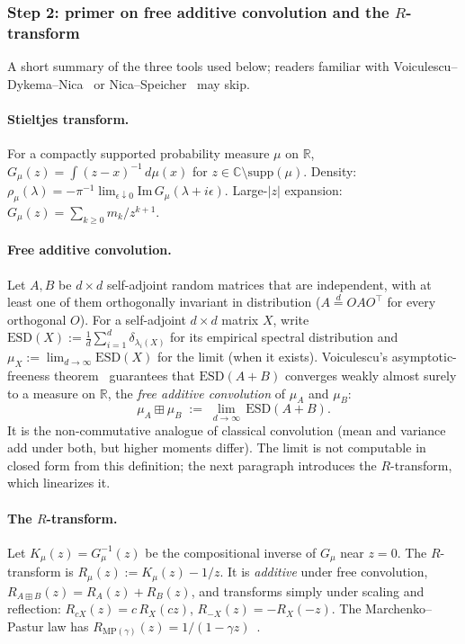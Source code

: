 \documentclass{article}
\newcommand{\R}{\mathbb{R}}
\begin{document}
\subsubsection{Step 2: primer on free additive convolution and the
$R$-transform}
\label{app:fp-primer}

A short summary of the three tools used below; readers familiar with
Voiculescu--Dykema--Nica~\cite{voiculescu1992} or
Nica--Speicher~\cite{nica2006} may skip.

\paragraph{Stieltjes transform.}
For a compactly supported probability measure $\mu$ on $\R$,
$G_\mu(z) = \int (z-x)^{-1}\,d\mu(x)$ for $z \in \mathbb{C}\setminus\mathrm{supp}(\mu)$.
Density: $\rho_\mu(\lambda) = -\pi^{-1}\lim_{\epsilon\downarrow 0}\mathrm{Im}\,G_\mu(\lambda+i\epsilon)$.
Large-$|z|$ expansion: $G_\mu(z) = \sum_{k\ge 0} m_k/z^{k+1}$.

\paragraph{Free additive convolution.}
Let $A, B$ be $d\times d$ self-adjoint random matrices that are
independent, with at least one of them orthogonally invariant in
distribution ($A \stackrel{d}{=} O A O^\top$ for every orthogonal
$O$). For a self-adjoint $d \times d$ matrix $X$, write
$\mathrm{ESD}(X) := \frac{1}{d}\sum_{i=1}^d \delta_{\lambda_i(X)}$
for its empirical spectral distribution and
$\mu_X := \lim_{d \to \infty}\mathrm{ESD}(X)$ for the limit (when it
exists). Voiculescu's asymptotic-freeness
theorem~\cite{voiculescu1992,nica2006} guarantees that
$\mathrm{ESD}(A+B)$ converges weakly almost surely to a measure on
$\R$, the \emph{free additive convolution} of $\mu_A$ and $\mu_B$:
\[
\mu_A \boxplus \mu_B \;:=\; \lim_{d\to\infty}\,\mathrm{ESD}(A+B).
\]
It is the non-commutative analogue of classical convolution (mean and
variance add under both, but higher moments differ). The limit is not
computable in closed form from this definition; the next paragraph
introduces the $R$-transform, which linearizes it.

\paragraph{The $R$-transform.}
Let $K_\mu(z) = G_\mu^{-1}(z)$ be the compositional inverse of $G_\mu$
near $z=0$. The $R$-transform is $R_\mu(z) := K_\mu(z) - 1/z$. It is
\emph{additive} under free convolution, $R_{A\boxplus B}(z) = R_A(z) + R_B(z)$,
and transforms simply under scaling and reflection:
$R_{cX}(z) = c\,R_X(cz)$, $R_{-X}(z) = -R_X(-z)$. The Marchenko--Pastur
law has $R_{\mathrm{MP}(\gamma)}(z) = 1/(1 - \gamma z)$~\cite{marchenko1967, bai2010, nica2006}.
\end{document}
